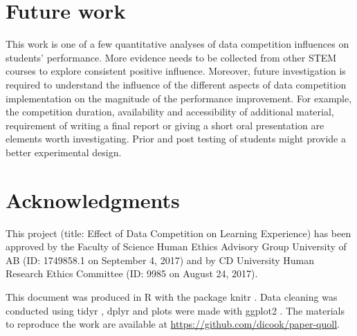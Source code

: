 \documentclass[12pt]{article}
\begin{document}
\section{Future work}\label{future-work}

This work is one of a few quantitative analyses of data competition
influences on students' performance. More evidence needs to be collected
from other STEM courses to explore consistent positive influence.
Moreover, future investigation is required to understand the influence
of the different aspects of data competition implementation on the
magnitude of the performance improvement. For example, the competition
duration, availability and accessibility of additional material,
requirement of writing a final report or giving a short oral
presentation are elements worth investigating. Prior and post testing of
students might provide a better experimental design.

\section{Acknowledgments}\label{acknowledgments}

This project (title: Effect of Data Competition on Learning Experience)
has been approved by the Faculty of Science Human Ethics Advisory Group
University of AB (ID: 1749858.1 on September 4, 2017) and by CD
University Human Research Ethics Committee (ID: 9985 on August 24,
2017).

This document was produced in R \citep{R} with the package knitr
\citep{knitr}. Data cleaning was conducted using tidyr \citep{tidyr},
dplyr \citep{dplyr} and plots were made with ggplot2 \citep{ggplot2}.
The materials to reproduce the work are available at
\url{https://github.com/dicook/paper-quoll}.



\end{document}

